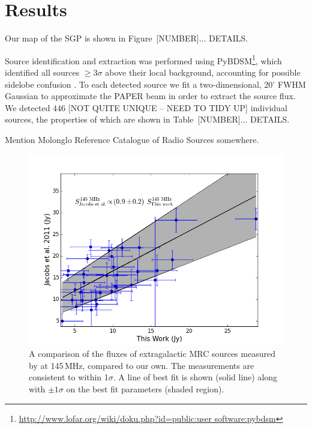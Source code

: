 \documentclass[useAMS,usenatbib]{mn2e}
\begin{document}
\section{Results}
\label{sec:res}

Our map of the SGP is shown in Figure~{\color{red}[NUMBER]... DETAILS}.

Source identification and extraction was performed using PyBDSM\footnote{\url{http://www.lofar.org/wiki/doku.php?id=public:user software:pybdsm}}, which identified all sources $\geq3\sigma$ above their local background, accounting for possible sidelobe confusion \citep{PyBDSM.15}. To each detected source we fit a two-dimensional, 20' FWHM Gaussian to approximate the PAPER beam \citep{Parsons.10} in order to extract the source flux. We detected $446$ {\color{red} [NOT QUITE UNIQUE -- NEED TO TIDY UP]} individual sources, the properties of which are shown in Table~{\color{red}[NUMBER]... DETAILS}. 

{\color{blue}Mention Molonglo Reference Catalogue of Radio Sources \citep[MRC][]{Large.81} somewhere}.

\begin{figure}
\includegraphics[width=\columnwidth]{us_and_danny_cal.png}
\caption{A comparison of the fluxes of extragalactic MRC sources measured by \protect\cite{Jacobs.11} at 145\,MHz, compared to our own. The measurements are consistent to within 1$\sigma$. A line of best fit is shown (solid line) along with $\pm1\sigma$ on the best fit parameters (shaded region).}
\end{figure}

\end{document}
